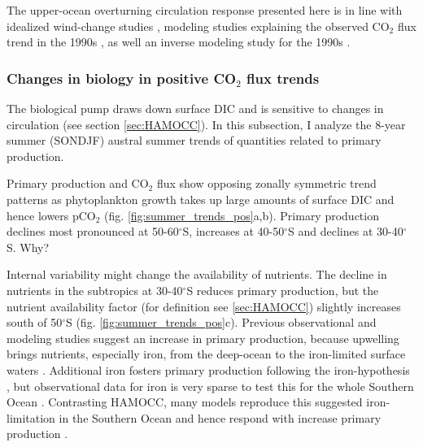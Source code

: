\documentclass[12pt]{article}
\begin{document}
The upper-ocean overturning circulation response presented here is in line with idealized wind-change studies \citep{Lauderdale2013}, modeling studies explaining the observed CO$_2$ flux trend in the 1990s \citep{LeQuere2007,Lovenduski2007,Lovenduski2008}, as well an inverse modeling study for the 1990s \citep{DeVries2017}.



\clearpage

\subsubsection{Changes in biology in positive CO$_2$ flux trends}
\label{sec:trends_pos_biology}
The biological pump draws down surface DIC and is sensitive to changes in circulation (see section \ref{sec:HAMOCC}). In this subsection, I analyze the 8-year summer (SONDJF) austral summer trends of quantities related to primary production. 
  
Primary production and CO$_2$ flux show opposing zonally symmetric trend patterns as phytoplankton growth takes up large amounts of surface DIC and hence lowers pCO$_2$ (fig. \ref{fig:summer_trends_pos}a,b). Primary production declines most pronounced at 50-60$^\circ$S, increases at 40-50$^\circ$S and declines at 30-40$^\circ$S. Why?

Internal variability might change the availability of nutrients. 
The decline in nutrients in the subtropics at 30-40$^\circ$S reduces primary production, but the nutrient availability factor (for definition see \ref{sec:HAMOCC}) slightly increases south of 50$^\circ$S (fig. \ref{fig:summer_trends_pos}c).
Previous observational and modeling studies suggest an increase in primary production, because upwelling brings nutrients, especially iron, from the deep-ocean to the iron-limited surface waters \citep{Lovenduski2005,Hauck2013,wang2012,Tagliabue2014}. Additional iron fosters primary production following the iron-hypothesis \citep{Martin1990Nature,Martin1990}, but observational data for iron is very sparse to test this for the whole Southern Ocean \citep{Tagliabue2014}. Contrasting HAMOCC, many models reproduce this suggested iron-limitation in the Southern Ocean and hence respond with increase primary production \citep{wang2012,Hauck2013}.  \newline
\end{document}
